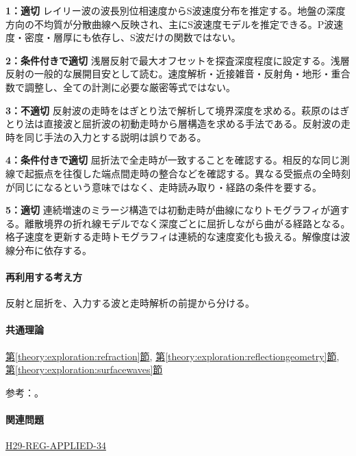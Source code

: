 \noindent\textbf{1：適切} レイリー波の波長別位相速度からS波速度分布を推定する。地盤の深度方向の不均質が分散曲線へ反映され、主にS波速度モデルを推定できる。P波速度・密度・層厚にも依存し、S波だけの関数ではない。\par

\noindent\textbf{2：条件付きで適切} 浅層反射で最大オフセットを探査深度程度に設定する。浅層反射の一般的な展開目安として読む。速度解析・近接雑音・反射角・地形・重合数で調整し、全ての計測に必要な厳密等式ではない。\par

\noindent\textbf{3：不適切} 反射波の走時をはぎとり法で解析して境界深度を求める。萩原のはぎとり法は直接波と屈折波の初動走時から層構造を求める手法である。反射波の走時を同じ手法の入力とする説明は誤りである。\par

\noindent\textbf{4：条件付きで適切} 屈折法で全走時が一致することを確認する。相反的な同じ測線で起振点を往復した端点間走時の整合などを確認する。異なる受振点の全時刻が同じになるという意味ではなく、走時読み取り・経路の条件を要する。\par

\noindent\textbf{5：適切} 連続増速のミラージ構造では初動走時が曲線になりトモグラフィが適する。離散境界の折れ線モデルでなく深度ごとに屈折しながら曲がる経路となる。格子速度を更新する走時トモグラフィは連続的な速度変化も扱える。解像度は波線分布に依存する。\par

\paragraph{再利用する考え方} 反射と屈折を、入力する波と走時解析の前提から分ける。

\paragraph{共通理論} \hyperref[theory:exploration:refraction]{第\ref*{theory:exploration:refraction}節}, \hyperref[theory:exploration:reflectiongeometry]{第\ref*{theory:exploration:reflectiongeometry}節}, \hyperref[theory:exploration:surfacewaves]{第\ref*{theory:exploration:surfacewaves}節}

\par 参考：\cite{jica_refraction2015,usgs_refraction2013,epa_surfacewaves,xia_rayleigh1999,coastal_reflection2016}。

\paragraph{関連問題} \hyperref[q:h29-reg-applied-34]{H29-REG-APPLIED-34}

